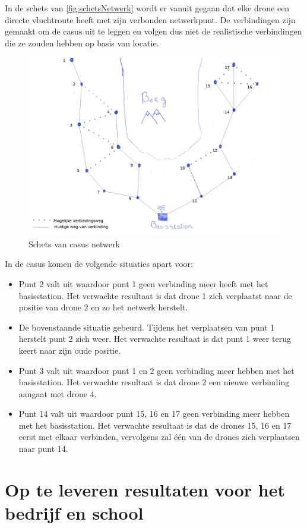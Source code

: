 \documentclass[a4paper, 11pt, oneside]{report}
\begin{document}
In de schets van \autoref{fig:schetsNetwerk} wordt er vanuit gegaan dat elke drone een directe vluchtroute heeft met zijn verbonden netwerkpunt.
De verbindingen zijn gemaakt  om de casus uit te leggen en volgen dus niet de realistische verbindingen die ze zouden hebben op basis van locatie.
\begin{figure}[H]
	\begin{center}\includegraphics[width=0.61\linewidth]{schetsNetwerk}\end{center}
	\caption{Schets van casus netwerk}
	\label{fig:schetsNetwerk}
\end{figure}
In de casus komen de volgende situaties apart voor:

\begin{itemize}
	\item Punt 2 valt uit waardoor punt 1 geen verbinding meer heeft met het basisstation. Het verwachte resultaat is dat drone 1 zich verplaatst naar de positie van drone 2 en zo het netwerk herstelt.
	\item De bovenstaande situatie gebeurd. Tijdens het verplaatsen van punt 1 herstelt punt 2 zich weer. Het verwachte resultaat is dat punt 1 weer terug  keert naar zijn oude positie.
	\item Punt 3 valt uit waardoor punt 1 en 2 geen verbinding meer hebben met het basisstation. Het verwachte resultaat is dat drone 2 een nieuwe verbinding aangaat met drone 4.
	\item Punt 14 valt uit waardoor punt 15, 16 en 17 geen verbinding meer hebben met het basisstation. Het verwachte resultaat is dat de drones 15, 16 en 17 eerst met elkaar verbinden, vervolgens zal één van de drones zich verplaatsen naar punt 14. 
\end{itemize}

\section{Op te leveren resultaten voor het bedrijf en school}\label{sec:op-te-leveren-resultaten-voor-het-bedrijf-en-school}
\end{document}
